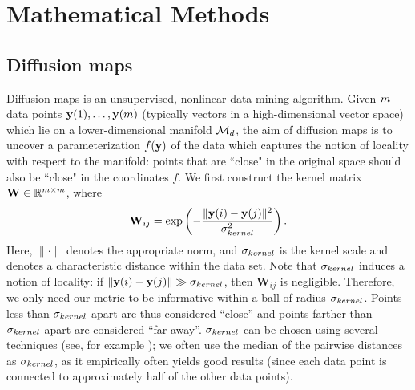 
\chapter{Mathematical Methods}\label{ch:math}

\section{Diffusion maps} \label{sec:dmaps}

Diffusion maps is an unsupervised, nonlinear data mining algorithm. 
%
Given $m$ data points $\mathbf{y}(1), \dots, \mathbf{y}(m)$ (typically vectors in a high-dimensional vector space) which lie on a lower-dimensional manifold $\mathcal{M}_d$, the aim of diffusion maps is to uncover a parameterization $f(\mathbf{y})$ of the data which captures the notion of locality with respect to the manifold: points that are ``close" in the original space should also be ``close" in the coordinates $f$.
%
%
%
We first construct the kernel matrix $\mathbf{W} \in \mathbb{R}^{m \times m}$, where
\begin{equation} \label{eq:dmaps_kernel}
\mathbf{W}_{ij} = \exp \left( -\frac{\|\mathbf{y}(i) - \mathbf{y}(j) \|^2}{\sigma_{kernel}^2} \right).
\end{equation}
Here, $\| \cdot \|$ denotes the appropriate norm, and $\sigma_{kernel}$ is the kernel scale
and denotes a characteristic distance within the data set.
%
Note that $\sigma_{kernel}$ induces a notion of locality: if $\|\mathbf{y}(i) - \mathbf{y}(j) \| \gg \sigma_{kernel}$, then $\mathbf{W}_{ij}$ is negligible.
%
Therefore, we only need our metric to be informative within a ball of radius $\sigma_{kernel}$.
%
Points less than $\sigma_{kernel}$ apart are thus considered ``close'' and points farther than $\sigma_{kernel}$ apart are considered ``far away''.
%
$\sigma_{kernel}$ can be chosen using several techniques (see, for example \citep{coifman2008graph, rohrdanz2011determination}); 
we often use the median of the pairwise distances as $\sigma_{kernel}$, as it empirically often yields good results (since each data point is connected to approximately half of the other data points).

